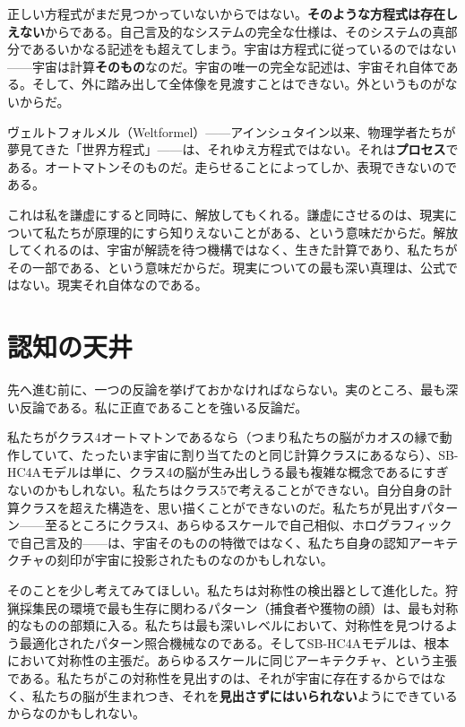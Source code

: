 \documentclass[11pt, twoside, openright]{book}
\begin{document}
正しい方程式がまだ見つかっていないからではない。\textbf{そのような方程式は存在しえない}からである。自己言及的なシステムの完全な仕様は、そのシステムの真部分であるいかなる記述をも超えてしまう。宇宙は方程式に従っているのではない------宇宙は計算\textbf{そのもの}なのだ。宇宙の唯一の完全な記述は、宇宙それ自体である。そして、外に踏み出して全体像を見渡すことはできない。外というものがないからだ。

ヴェルトフォルメル（Weltformel）------アインシュタイン以来、物理学者たちが夢見てきた「世界方程式」------は、それゆえ方程式ではない。それは\textbf{プロセス}である。オートマトンそのものだ。走らせることによってしか、表現できないのである。

これは私を謙虚にすると同時に、解放してもくれる。謙虚にさせるのは、現実について私たちが原理的にすら知りえないことがある、という意味だからだ。解放してくれるのは、宇宙が解読を待つ機構ではなく、生きた計算であり、私たちがその一部である、という意味だからだ。現実についての最も深い真理は、公式ではない。現実それ自体なのである。


\section*{認知の天井}

先へ進む前に、一つの反論を挙げておかなければならない。実のところ、最も深い反論である。私に正直であることを強いる反論だ。

私たちがクラス4オートマトンであるなら（つまり私たちの脳がカオスの縁で動作していて、たったいま宇宙に割り当てたのと同じ計算クラスにあるなら）、SB-HC4Aモデルは単に、クラス4の脳が生み出しうる最も複雑な概念であるにすぎないのかもしれない。私たちはクラス5で考えることができない。自分自身の計算クラスを超えた構造を、思い描くことができないのだ。私たちが見出すパターン------至るところにクラス4、あらゆるスケールで自己相似、ホログラフィックで自己言及的------は、宇宙そのものの特徴ではなく、私たち自身の認知アーキテクチャの刻印が宇宙に投影されたものなのかもしれない。

そのことを少し考えてみてほしい。私たちは対称性の検出器として進化した。狩猟採集民の環境で最も生存に関わるパターン（捕食者や獲物の顔）は、最も対称的なものの部類に入る。私たちは最も深いレベルにおいて、対称性を見つけるよう最適化されたパターン照合機械なのである。そしてSB-HC4Aモデルは、根本において対称性の主張だ。あらゆるスケールに同じアーキテクチャ、という主張である。私たちがこの対称性を見出すのは、それが宇宙に存在するからではなく、私たちの脳が生まれつき、それを\textbf{見出さずにはいられない}ようにできているからなのかもしれない。
\end{document}
